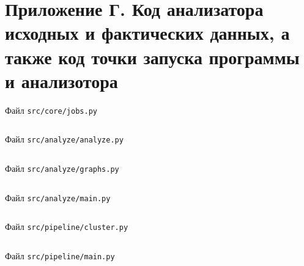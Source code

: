 \section*{Приложение Г. Код анализатора исходных и фактических данных, а также код точки запуска программы и анализотора}
\label{app:src-code}

\renewcommand{\theFancyVerbLine}{%
    \scriptsize\ttfamily\textcolor{gray}{\arabic{FancyVerbLine}}%
}

Файл \texttt{src/core/jobs.py}

\inputminted[linenos, numbersep=10pt, firstnumber=1, fontsize=\scriptsize, breaklines]{python}{../src/core/jobs.py}

Файл \texttt{src/analyze/analyze.py}

\inputminted[linenos, numbersep=10pt, firstnumber=1, fontsize=\scriptsize, breaklines]{python}{../src/analyze/analyze.py}

Файл \texttt{src/analyze/graphs.py}

\inputminted[linenos, numbersep=10pt, firstnumber=1, fontsize=\scriptsize, breaklines]{python}{../src/analyze/graphs.py}

Файл \texttt{src/analyze/main.py}

\inputminted[linenos, numbersep=10pt, firstnumber=1, fontsize=\scriptsize, breaklines]{python}{../src/analyze/main.py}

Файл \texttt{src/pipeline/cluster.py}

\inputminted[linenos, numbersep=10pt, firstnumber=1, fontsize=\scriptsize, breaklines]{python}{../src/pipeline/cluster.py}

Файл \texttt{src/pipeline/main.py}

\inputminted[linenos, numbersep=10pt, firstnumber=1, fontsize=\scriptsize, breaklines]{python}{../src/pipeline/main.py}
